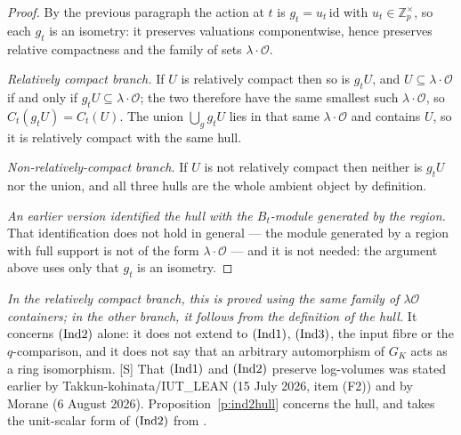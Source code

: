 \documentclass[11pt]{article}
\theoremstyle{plain}
\theoremstyle{definition}
\newcommand{\Ind}[1]{\textup{(Ind#1)}}
\begin{document}
\begin{proof}
By the previous paragraph the action at $t$ is $g_t=u_t\,\mathrm{id}$ with
$u_t\in\mathbb{Z}_p^{\times}$, so each $g_t$ is an isometry: it preserves valuations
componentwise, hence preserves relative compactness and the family of sets
$\lambda\cdot\mathcal O$.

\emph{Relatively compact branch.}  If $U$ is relatively compact then so is $g_tU$, and
$U\subseteq\lambda\cdot\mathcal O$ if and only if $g_tU\subseteq\lambda\cdot\mathcal O$;
the two therefore have the same smallest such $\lambda\cdot\mathcal O$, so
$C_t(g_tU)=C_t(U)$.  The union $\bigcup_g g_tU$ lies in that same
$\lambda\cdot\mathcal O$ and contains $U$, so it is relatively compact with the same
hull.

\emph{Non-relatively-compact branch.}  If $U$ is not relatively compact then neither is
$g_tU$ nor the union, and all three hulls are the whole ambient object by definition.

\emph{An earlier version identified the hull with the $B_t$-module generated by the
region.}  That identification does not hold in general --- the module generated by a
region with full support is not of the form $\lambda\cdot\mathcal O$ --- and it is not
needed: the argument above uses only that $g_t$ is an isometry.
\end{proof}

\emph{In the relatively compact branch, this is proved using the same family of
$\lambda\mathcal O$ containers; in the other branch, it follows from the definition
of the hull.}  It concerns $\Ind2$ alone: it does not extend to
$\Ind1$, $\Ind3$, the input fibre or the $q$-comparison, and it does not say that an
arbitrary automorphism of $G_K$ acts as a ring isomorphism.  \textup{[S]} That $\Ind1$
and $\Ind2$ preserve log-volumes was stated earlier by Takkun-kohinata/IUT\_LEAN
\cite{TK} (15 July 2026, item (F2)) and by Morane \cite[\S8.2]{Mor} (6 August 2026).
Proposition~\ref{p:ind2hull} concerns the hull, and takes the unit-scalar form of
$\Ind2$ from \cite{MT}.
\end{document}
